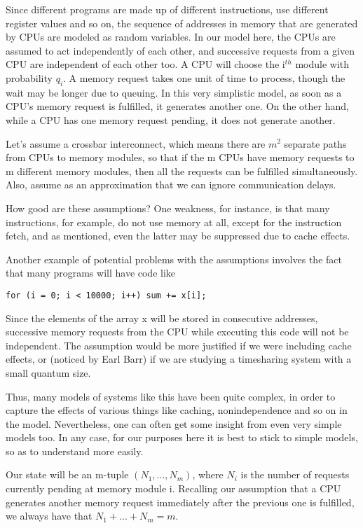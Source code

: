 Since different programs are made up of different instructions, use
different register values and so on, the sequence of addresses in memory
that are generated by CPUs are modeled as random variables.  In our
model here, the CPUs are assumed to act independently of each other, and
successive requests from a given CPU are independent of each other too.
A CPU will choose the i$^{th}$ module with probability $q_{i}$. A memory
request takes one unit of time to process, though the wait may be longer
due to queuing.  In this very simplistic model, as soon as a CPU's
memory request is fulfilled, it generates another one.  On the other
hand, while a CPU has one memory request pending, it does not generate
another.

Let's assume a crossbar interconnect, which means there are $m^2$
separate paths from CPUs to memory modules, so that if the m CPUs have
memory requests to m different memory modules, then all the requests can
be fulfilled simultaneously.  Also, assume as an approximation that we
can ignore communication delays.

How good are these assumptions?  One weakness, for instance, is that
many instructions, for example, do not use memory at all, except for the
instruction fetch, and as mentioned, even the latter may be suppressed
due to cache effects.  

Another example of potential problems with the assumptions involves the
fact that many programs will have code like

\begin{verbatim}
for (i = 0; i < 10000; i++) sum += x[i];
\end{verbatim}

Since the elements of the array x will be stored in consecutive
addresses, successive memory requests from the CPU while executing this
code will not be independent.  The assumption would be more justified if
we were including cache effects, or (noticed by Earl Barr) if we are
studying a timesharing system with a small quantum size.  

Thus, many models of systems like this have been quite complex, in order
to capture the effects of various things like caching, nonindependence
and so on in the model.  Nevertheless, one can often get some insight
from even very simple models too.  In any case, for our purposes here it
is best to stick to simple models, so as to understand more easily.

Our state will be an m-tuple $(N_{1},...,N_{m})$, where $N_{i}$ is the
number of requests currently pending at memory module i.  Recalling our
assumption that a CPU generates another memory request immediately after
the previous one is fulfilled, we always have that $N_{1}+...+N_{m}=m$.

